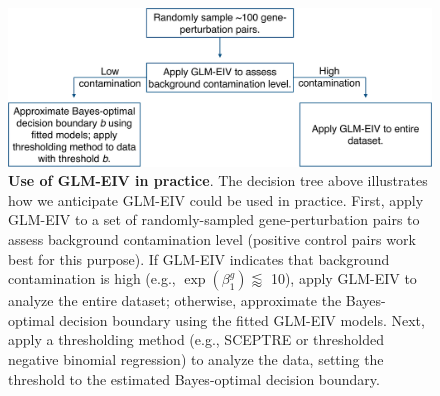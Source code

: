 \documentclass[11pt]{article}
\begin{document}
\clearpage
\begin{figure}[h!]
	\centering
	\includegraphics[width=0.9\linewidth]{../../figures/dec_tree/dec_tree_crop}
	\caption{\textbf{Use of GLM-EIV in practice}. The decision tree above illustrates how we anticipate GLM-EIV could be used in practice. First, apply GLM-EIV to a set of randomly-sampled gene-perturbation pairs to assess background contamination level (positive control pairs work best for this purpose). If GLM-EIV indicates that background contamination is high (e.g., $\exp(\beta^g_1) \lessapprox $ 10), apply GLM-EIV to analyze the entire dataset; otherwise, approximate the Bayes-optimal decision boundary using the fitted GLM-EIV models. Next, apply a thresholding method (e.g., SCEPTRE or thresholded negative binomial regression) to analyze the data, setting the threshold to the estimated Bayes-optimal decision boundary.}\label{fig:dec_tree}
\end{figure}
\clearpage
\end{document}
